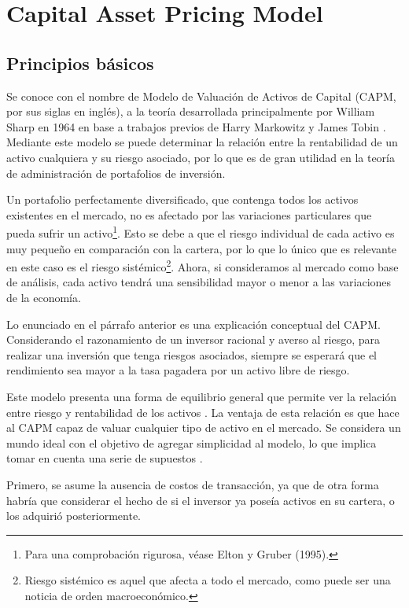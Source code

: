 
\chapter{Capital Asset Pricing Model}\label{CAPM}

\section{Principios básicos}

Se conoce con el nombre de Modelo de Valuación de Activos de Capital (CAPM, por sus siglas en inglés), a la teoría desarrollada principalmente por William Sharp en 1964 en base a trabajos previos de Harry Markowitz y James Tobin \cite{sharp}. Mediante este modelo se puede determinar la relación entre la rentabilidad de un activo cualquiera y su riesgo asociado, por lo que es de gran utilidad en la teoría de administración de portafolios de inversión. 

Un portafolio perfectamente diversificado, que contenga todos los activos existentes en el mercado, no es afectado por las variaciones particulares que pueda sufrir un activo\footnote{Para una comprobación rigurosa, véase Elton y Gruber (1995).\nocite{elton}}. Esto se debe a que el riesgo individual de cada activo es muy pequeño en comparación con la cartera, por lo que lo único que es relevante en este caso es el riesgo sistémico\footnote{Riesgo sistémico es aquel que afecta a todo el mercado, como puede ser una noticia de orden macroeconómico.}. Ahora, si consideramos al mercado como base de análisis, cada activo tendrá una sensibilidad mayor o menor a las variaciones de la economía.

Lo enunciado en el párrafo anterior es una explicación conceptual del CAPM. Considerando el razonamiento de un inversor racional y averso al riesgo, para realizar una inversión que tenga riesgos asociados, siempre se esperará que el rendimiento sea mayor a la tasa pagadera por un activo libre de riesgo.

Este modelo presenta una forma de equilibrio general que permite ver la relación entre riesgo y rentabilidad de los activos \cite{elton}. La ventaja de esta relación es que hace al CAPM capaz de valuar cualquier tipo de activo en el mercado. Se considera un mundo ideal con el objetivo de agregar simplicidad al modelo, lo que implica tomar en cuenta una serie de supuestos \cite{elton}.

Primero, se asume la ausencia de costos de transacción, ya que de otra forma habría que considerar el hecho de si el inversor ya poseía activos en su cartera, o los adquirió posteriormente. 

